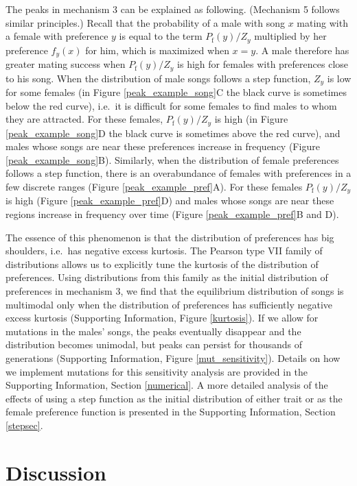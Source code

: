 \documentclass[12pt]{article}
\newcommand{\x}[1]{\text{#1}}
\begin{document}
The peaks in mechanism 3 can be explained as following. (Mechanism 5 follows similar principles.) Recall that the probability of a male with song $x$ mating with a female with preference $y$ is equal to the term $P_\x{f}(y)/Z_y$ multiplied by her preference $f_y(x)$ for him, which is maximized when $x=y$. A male therefore has greater mating success when $P_\x{f}(y)/Z_y$ is high for females with preferences close to his song. When the distribution of male songs follows a step function, $Z_y$ is low for some females (in Figure \ref{peak_example_song}C the black curve is sometimes below the red curve), i.e.\ it is difficult for some females to find males to whom they are attracted. For these females, $P_\x{f}(y)/Z_y$ is high (in Figure \ref{peak_example_song}D the black curve is sometimes above the red curve), and males whose songs are near these preferences increase in frequency (Figure \ref{peak_example_song}B). Similarly, when the distribution of female preferences follows a step function, there is an overabundance of females with preferences in a few discrete ranges (Figure \ref{peak_example_pref}A). For these females $P_\x{f}(y)/Z_y$ is high (Figure \ref{peak_example_pref}D) and males whose songs are near these regions increase in frequency over time (Figure \ref{peak_example_pref}B and D). 

The essence of this phenomenon is that the distribution of preferences has big shoulders, i.e.\ has negative excess kurtosis. The Pearson type VII family of distributions allows us to explicitly tune the kurtosis of the distribution of preferences. Using distributions from this family as the initial distribution of preferences in mechanism 3, we find that the equilibrium distribution of songs is multimodal only when the distribution of preferences has sufficiently negative excess kurtosis (Supporting Information, Figure \ref{kurtosis}). If we allow for mutations in the males' songs, the peaks eventually disappear and the distribution becomes unimodal, but peaks can persist for thousands of generations (Supporting Information, Figure \ref{mut_sensitivity}). Details on how we implement mutations for this sensitivity analysis are provided in the Supporting Information, Section \ref{numerical}. A more detailed analysis of the effects of using a step function as the initial distribution of either trait or as the female preference function is presented in the Supporting Information, Section \ref{stepsec}.

\section*{Discussion}
\end{document}
